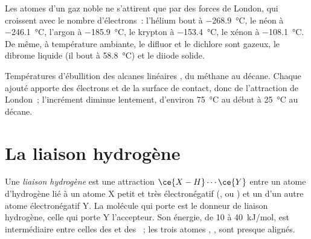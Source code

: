 \begin{example}\label{ex:b1:intermolecular-forces-solvents:noble}
Les atomes d'un gaz noble ne s'attirent que par des forces de London,
qui croissent avec le nombre d'électrons~: l'hélium bout à
\qty{-268.9}{\celsius}, le néon à \qty{-246.1}{\celsius}, l'argon à
\qty{-185.9}{\celsius}, le krypton à \qty{-153.4}{\celsius}, le xénon à
\qty{-108.1}{\celsius}. De même, à température ambiante, le difluor et le
dichlore sont gazeux, le dibrome liquide (il bout à \qty{58.8}{\celsius})
et le diiode solide.
\end{example}

\begin{omfigure}

{\small Températures d'ébullition des alcanes linéaires ,
du méthane au décane. Chaque  ajouté apporte des électrons et de
la surface de contact, donc de l'attraction de London~; l'incrément
diminue lentement, d'environ \qty{75}{\celsius} au début à
\qty{25}{\celsius} au décane.}
\end{omfigure}

\section{La liaison hydrogène}

\begin{definition}\label{def:b1:intermolecular-forces-solvents:hbond}
Une \emph{liaison hydrogène} est une attraction
$\ce{X-H}\cdots\ce{Y}$ entre un atome d'hydrogène lié à un atome X petit
et très électronégatif (,  ou ) et un 
d'un autre atome électronégatif Y. La molécule qui porte  est le
donneur de liaison hydrogène, celle qui porte Y l'accepteur. Son
énergie, de 10 à \qty{40}{kJ/mol}, est intermédiaire entre celles des
 et des ~; les trois
atomes , ,  sont presque alignés.
\end{definition}

